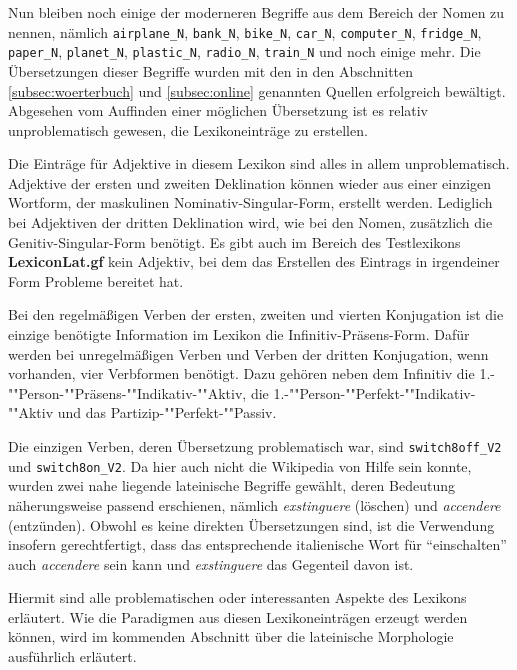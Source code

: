 Nun bleiben noch einige der moderneren Begriffe aus dem Bereich der Nomen zu nennen, nämlich \texttt{airplane\_N}, \texttt{bank\_N}, \texttt{bike\_N}, \texttt{car\_N}, \texttt{computer\_N}, \texttt{fridge\_N}, \texttt{paper\_N}, \texttt{planet\_N}, \texttt{plastic\_N}, \texttt{radio\_N}, \texttt{train\_N} und noch einige mehr. Die Übersetzungen dieser Begriffe wurden mit den in den Abschnitten \ref{subsec:woerterbuch} und \ref{subsec:online} genannten Quellen erfolgreich bewältigt. Abgesehen vom Auffinden einer möglichen Übersetzung ist es relativ unproblematisch gewesen, die Lexikoneinträge zu erstellen. \par
Die Einträge für Adjektive in diesem Lexikon sind alles in allem unproblematisch. Adjektive der ersten und zweiten Deklination können wieder aus einer einzigen Wortform, der maskulinen Nominativ-Singular-Form, erstellt werden. Lediglich bei Adjektiven der dritten Deklination wird, wie bei den Nomen, zusätzlich die Genitiv-Singular-Form benötigt. Es gibt auch im Bereich des Testlexikons \textbf{LexiconLat.gf} kein Adjektiv, bei dem das Erstellen des Eintrags in irgendeiner Form Probleme bereitet hat. \par
Bei den regelmäßigen Verben der ersten, zweiten und vierten Konjugation ist die einzige benötigte Information im Lexikon die Infinitiv-Präsens-Form. Dafür werden bei unregelmäßigen Verben und Verben der dritten Konjugation, wenn vorhanden, vier Verbformen benötigt. Dazu gehören neben dem Infinitiv die 1.-""Person-""Präsens-""Indikativ-""Aktiv, die 1.-""Person-""Perfekt-""Indikativ-""Aktiv und das Partizip-""Perfekt-""Passiv. \par
Die einzigen Verben, deren Übersetzung problematisch war, sind \texttt{switch8off\_V2} und \texttt{switch8on\_V2}. Da hier auch nicht die Wikipedia von Hilfe sein konnte, wurden zwei nahe liegende lateinische Begriffe gewählt, deren Bedeutung näherungsweise passend erschienen, nämlich \textit{exstinguere} (löschen) und \textit{accendere} (entzünden). Obwohl es keine direkten Übersetzungen sind, ist die Verwendung insofern gerechtfertigt, dass das entsprechende italienische Wort für ``einschalten'' auch \textit{accendere} sein kann und \textit{exstinguere} das Gegenteil davon ist. \par
Hiermit sind alle problematischen oder interessanten Aspekte des Lexikons erläutert. Wie die Paradigmen aus diesen Lexikoneinträgen erzeugt werden können, wird im kommenden Abschnitt über die lateinische Morphologie ausführlich erläutert.